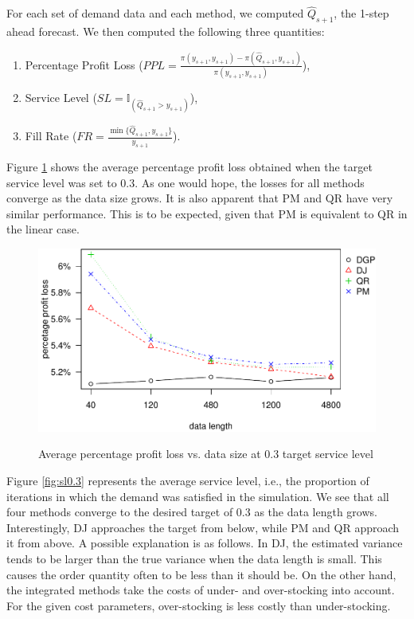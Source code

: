 \documentclass{article}
\begin{document}
For each set of demand data and each method, we computed $\hat{Q}_{s+1}$, the 1-step ahead forecast. We then computed the following three quantities:
\begin{enumerate}
    \item Percentage Profit Loss ($PPL=\frac{\pi(y_{s+1},y_{s+1})-\pi(\hat{Q}_{s+1},y_{s+1})}{\pi(y_{s+1},y_{s+1})}$),
    \item Service Level ($SL=\mathbb {I}_{(\hat{Q}_{s+1}>y_{s+1})}$),
    \item Fill Rate ($FR=\frac{\min\{\hat{Q}_{s+1},y_{s+1}\}}{y_{s+1}}$).
\end{enumerate}

 Figure \ref{fig:ppl0.3} shows the average percentage profit loss obtained when the target service level was set to $0.3$. As one would hope, the losses for all methods converge as the data size grows. It is also apparent that PM and QR have very similar performance. This is to be expected, given that PM is equivalent to QR in the linear case.

\begin{figure}
\centering
\caption{Average percentage profit loss vs. data size at 0.3 target service level}
\includegraphics{linear-norm-plot_files/figure-latex/ppl0.3-1.pdf}
\label{fig:ppl0.3}
\end{figure}

Figure \ref{fig:sl0.3} represents the average service level, i.e., the proportion of iterations in which the demand was satisfied in the simulation.
We see that all four methods converge to the desired target of 0.3 as the data length grows. Interestingly, DJ approaches the target from below, while PM and QR approach it from above. A possible explanation is as follows. In DJ, the estimated variance tends to be larger than the true variance when the data length is small. This causes the order quantity often to be less than it should be. On the other hand, the integrated methods take the costs of under- and over-stocking into account. For the given cost parameters, over-stocking is less costly than under-stocking.
\end{document}
